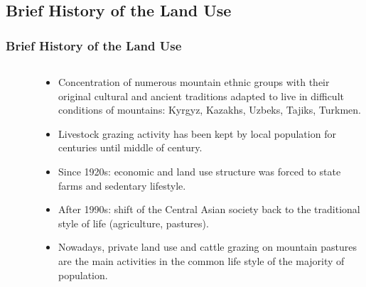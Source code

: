 \documentclass[pdflatex,compress,8pt,
	xcolor={dvipsnames,dvipsnames,svgnames,x11names,table},
	hyperref={colorlinks = true,
	breaklinks = true, 
	urlcolor = NavyBlue, 
	breaklinks = true}]{beamer}
\begin{document}
\subsection{Brief History of the Land Use}
\begin{frame}\frametitle{Brief History of the Land Use}

\begin{minipage}[0.4\textheight]{\textwidth}
\begin{columns}[T]
\begin{column}{0.5\textwidth}
\begin{figure}[H]
	\centering
			\vspace{1mm}
\end{figure}
\end{column}
\begin{column}{0.5\textwidth}
\vspace{2em}
\begin{itemize}
	\item Concentration of numerous mountain ethnic groups with their original cultural and ancient traditions adapted to live in difficult conditions of mountains: Kyrgyz, Kazakhs, Uzbeks, Tajiks, Turkmen.
	\item Livestock grazing activity has been kept by local population for centuries until middle of  century.
	\item Since 1920s: economic and land use structure was forced to state farms and sedentary lifestyle.
	\item After 1990s: shift of the Central Asian society back to the traditional style of life (agriculture, pastures).
	\item Nowadays, private land use and cattle grazing on mountain pastures are the main activities in the common life style of the majority of population.
\end{itemize}
\end{column}
\end{columns}
\end{minipage}

\end{frame}
\end{document}
